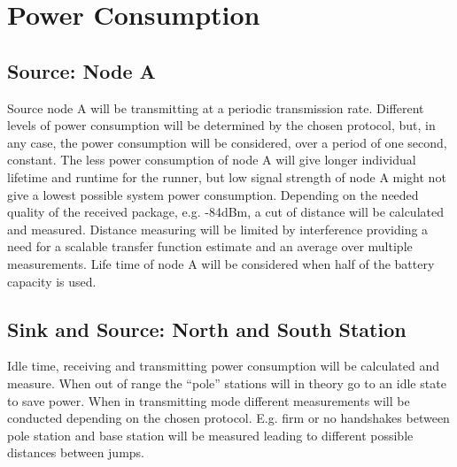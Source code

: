 \section{Power Consumption}\label{sc:powerConsumption}
\subsection{Source: Node A}
Source node A will be transmitting at a periodic transmission rate. Different levels of power consumption will be determined by the chosen protocol, but, in any case, the power consumption will be considered, over a period of one second, constant. The less power consumption of node A will give longer individual lifetime and runtime for the runner, but low signal strength of node A might not give a lowest possible system power consumption. Depending on the needed quality of the received package, e.g. -84dBm, a cut of distance will be calculated and measured. Distance measuring will be limited by interference providing a need for a scalable transfer function estimate and an average over multiple measurements. Life time of node A will be considered when half of the battery capacity is used.

\subsection{Sink and Source: North and South Station}

Idle time, receiving and transmitting power consumption will be calculated and measure. When out of range the “pole” stations will in theory go to an idle state to save power. When in transmitting mode different measurements will be conducted depending on the chosen protocol. E.g. firm or no handshakes between pole station and base station will be measured leading to different possible distances between jumps.
